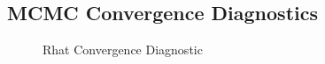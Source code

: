 \documentclass[
  letterpaper,
  DIV=11,
  numbers=noendperiod]{scrartcl}
\begin{document}
\subsection{MCMC Convergence
Diagnostics}\label{mcmc-convergence-diagnostics}

\begin{figure}[H]


\caption{\label{fig-mcmc-convergence}Rhat Convergence Diagnostic}

\end{figure}%
\end{document}

